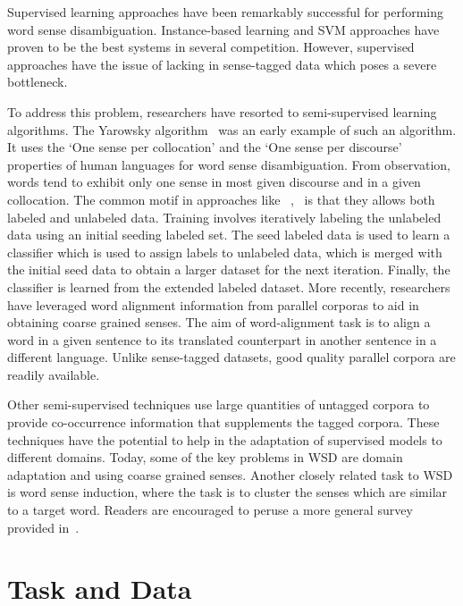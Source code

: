 \documentclass[12pt,letterpaper]{article}
\newcommand{\blue}[1]{\textcolor{RoyalBlue}{#1}}
\newcommand{\instructions}[1]{\blue{\textit{#1}}}
\begin{document}
Supervised learning approaches have been remarkably successful for performing word sense disambiguation. Instance-based learning and SVM approaches have proven to be the best systems in several competition. However, supervised approaches have the issue of lacking in sense-tagged data which poses a severe bottleneck. 

To address this problem, researchers have resorted to semi-supervised learning algorithms. The Yarowsky algorithm~\cite{yarowsky1995unsupervised} was an early example of such an algorithm. It uses the `One sense per collocation' and the `One sense per discourse' properties of human languages for word sense disambiguation. From observation, words tend to exhibit only one sense in most given discourse and in a given collocation. The common motif in approaches like ~\cite{yarowsky1995unsupervised},~\cite{le2008semi} is that they allows both labeled and unlabeled data. Training involves iteratively labeling the unlabeled data using an initial seeding labeled set. The seed labeled data is used to learn a classifier which is used to assign labels to unlabeled data, which is merged with the initial seed data to obtain a larger dataset for the next iteration. Finally, the classifier is learned from the extended labeled dataset.
More recently, researchers~\cite{Ng} have leveraged word alignment information from parallel corporas to aid in obtaining coarse grained senses. The aim of word-alignment task is to align a word in a given sentence to its translated counterpart in another sentence in a different language. Unlike sense-tagged datasets, good quality parallel corpora are readily available. 

Other semi-supervised techniques use large quantities of untagged corpora to provide co-occurrence information that supplements the tagged corpora. These techniques have the potential to help in the adaptation of supervised models to different domains. Today, some of the key problems in WSD are domain adaptation and using coarse grained senses. Another closely related task to WSD is word sense induction, where the task is to cluster the senses which are similar to a target word. Readers are encouraged to peruse a more general  survey provided in~\cite{navigli2009word}. 

\section{Task and Data}
\label{sec:taskAndData}
\end{document}
